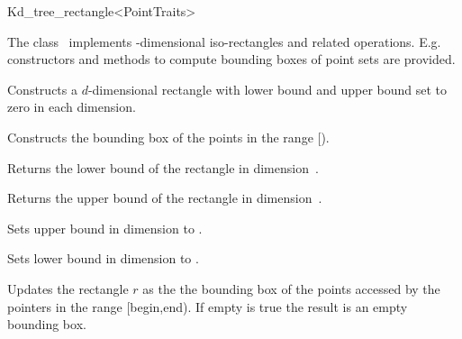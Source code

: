 

\begin{ccRefClass}{Kd_tree_rectangle<PointTraits>}  %


\ccDefinition
  
The class \ccRefName\ implements -dimensional iso-rectangles and related operations.
E.g. constructors and methods to compute bounding boxes of point sets are provided. 



\ccCreation
{}  %

\ccTypes



{Constructs a $d$-dimensional rectangle  with lower bound and upper bound set to zero 
in each dimension.}
 
{Constructs the bounding box of the points in the range [).}

\ccOperations

{Returns the lower bound of the rectangle in dimension~.}

{Returns the upper bound of the rectangle in dimension~.}



{Sets upper bound in dimension  to .}

{Sets lower bound in dimension  to .}
 
{Updates the rectangle $r$ as the the bounding box of the points accessed by the pointers
 in the range [begin,end). If empty is true the result is an empty bounding box.} 
 

\end{ccRefClass}
